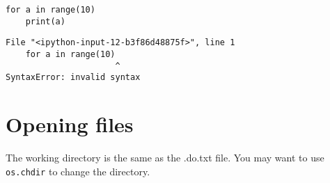 \documentclass[%
oneside,                 %
final,                   %
chapterprefix=true,      %
open=right,              %
10pt]{book}
\begin{document}
\begin{Verbatim}[numbers=none,fontsize=\fontsize{9pt}{9pt},baselinestretch=0.95]
for a in range(10)
    print(a)
\end{Verbatim}
\begin{Verbatim}[numbers=none,fontsize=\fontsize{9pt}{9pt},baselinestretch=0.95]
  File "<ipython-input-12-b3f86d48875f>", line 1
    for a in range(10)
                      ^
SyntaxError: invalid syntax
\end{Verbatim}

\section{Opening files}

The working directory is the same as the .do.txt file.
You may want to use \texttt{os.chdir} to change the directory.
\end{document}
